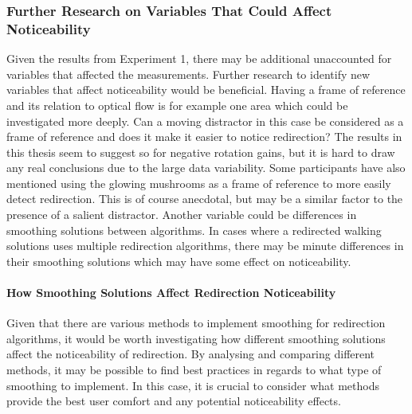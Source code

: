 \subsubsection{Further Research on Variables That Could Affect Noticeability}
Given the results from Experiment 1, there may be additional unaccounted for variables that affected the measurements. Further research to identify new variables that affect noticeability would be beneficial. Having a frame of reference and its relation to optical flow is for example one area which could be investigated more deeply. Can a moving distractor in this case be considered as a frame of reference and does it make it easier to notice redirection? The results in this thesis seem to suggest so for negative rotation gains, but it is hard to draw any real conclusions due to the large data variability. Some participants have also mentioned using the glowing mushrooms as a frame of reference to more easily detect redirection. This is of course anecdotal, but may be a similar factor to the presence of a salient distractor. Another variable could be differences in smoothing solutions between algorithms. In cases where a redirected walking solutions uses multiple redirection algorithms, there may be minute differences in their smoothing solutions which may have some effect on noticeability. 

\paragraph{How Smoothing Solutions Affect Redirection Noticeability} 
Given that there are various methods to implement smoothing for redirection algorithms, it would be worth investigating how different smoothing solutions affect the noticeability of redirection. By analysing and comparing different methods, it may be possible to find best practices in regards to what type of smoothing to implement. In this case, it is crucial to consider what methods provide the best user comfort and any potential noticeability effects. 

